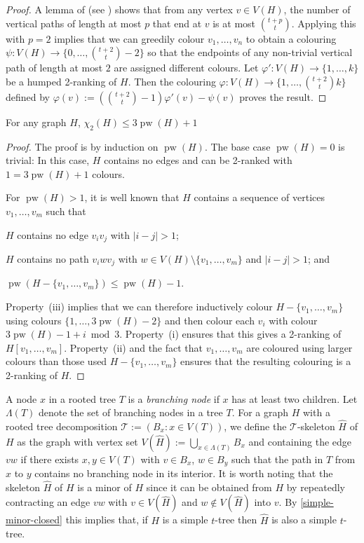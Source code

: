 \documentclass[kpfonts]{patmorin}
\DeclareMathOperator{\pw}{pw}
\newcommand{\trn}{\chi_2}
\theoremstyle{named}
\begin{document}
\begin{proof}
    A lemma of \citet{pilipczuk.siebertz:polynomial} (see \cite[Lemma~13]{pilipczuk.siebertz:polynomial-arxiv}) shows that from any vertex $v\in V(H)$, the number of vertical paths of length at most $p$ that end at $v$ is at most $\binom{t+p}{t}$.  Applying this with $p=2$ implies that we can greedily colour $v_1,\ldots,v_n$ to obtain a colouring $\psi:V(H)\to \{0,\ldots,\binom{t+2}{t}-2\}$ so that the endpoints of any non-trivial vertical path of length at most $2$ are assigned different colours.  Let $\varphi':V(H)\to\{1,\ldots,k\}$ be a humped 2-ranking of $H$.  Then the colouring $\varphi:V(H)\to\{1,\ldots,\binom{t+2}{t}k\}$ defined by $\varphi(v):=(\binom{t+2}{t}-1)\varphi'(v)-\psi(v)$ proves the result.
\end{proof}


\begin{lem}\label{pathwidth}
    For any graph $H$, $\trn(H)\le 3\pw(H) + 1$
\end{lem}

\begin{proof}
    The proof is by induction on $\pw(H)$.  The base case $\pw(H)=0$ is trivial: In this case, $H$ contains no edges and can be 2-ranked with $1 = 3\pw(H)+1$ colours.

    For $\pw(H)>1$, it is well known that $H$ contains a sequence of vertices $v_1,\ldots,v_m$  such that
    \begin{inparaenum}[(i)]
        \item $H$ contains no edge $v_iv_j$ with $|i-j|>1$;
        \item $H$ contains no path $v_iw v_j$ with $w\in V(H)\setminus\{v_1,\ldots,v_m\}$ and $|i-j|>1$; and
        \item $\pw(H-\{v_1,\ldots,v_m\})\le \pw(H)-1$.
    \end{inparaenum}
    Property~(iii) implies that we can therefore inductively colour $H-\{v_1,\ldots,v_m\}$ using colours $\{1,\ldots,3\pw(H)-2\}$ and then colour each $v_i$ with colour $3\pw(H)-1+i\bmod 3$.  Property~(i) ensures that this gives a 2-ranking of $H[v_1,\ldots,v_m]$.  Property~(ii) and the fact that $v_1,\ldots,v_m$ are coloured using larger colours than those used $H-\{v_1,\ldots,v_m\}$ ensures that the resulting colouring is a 2-ranking of $H$.
\end{proof}

A node $x$ in a rooted tree $T$ is a \emph{branching node} if $x$ has at least two children.  Let $\Lambda(T)$ denote the set of branching nodes in a tree $T$. For a graph $H$ with a rooted tree decomposition $\mathcal{T}:=(B_x:x\in V(T))$, we define the $\mathcal{T}$-skeleton $\hat{H}$ of $H$ as the graph with vertex set $V(\hat{H}):=\bigcup_{x\in \Lambda(T)} B_x$ and containing the edge $vw$ if there exists $x,y\in V(T)$ with $v\in B_x$, $w\in B_y$ such that the path in $T$ from $x$ to $y$ contains no branching node in its interior.  It is worth noting that the skeleton $\hat{H}$ of $H$ is a minor of $H$ since it can be obtained from $H$ by repeatedly contracting an edge $vw$ with $v\in V(\hat{H})$ and $w\not\in V(\hat{H})$ into $v$. By \cref{simple-minor-closed} this implies that, if $H$ is a simple $t$-tree then $\hat{H}$ is also a simple $t$-tree.
\end{document}
